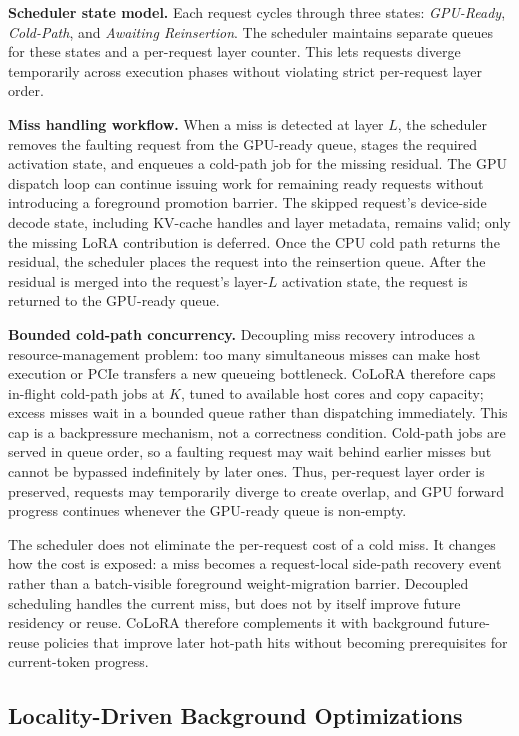 \documentclass[sigplan,anonymous,review,10pt]{acmart}
\begin{document}
\noindent\textbf{Scheduler state model.}
Each request cycles through three states: \textit{GPU-Ready}, \textit{Cold-Path}, and \textit{Awaiting Reinsertion}. The scheduler maintains separate queues for these states and a per-request layer counter. This lets requests diverge temporarily across execution phases without violating strict per-request layer order.

\noindent\textbf{Miss handling workflow.}
When a miss is detected at layer $L$, the scheduler removes the faulting request from the GPU-ready queue, stages the required activation state, and enqueues a cold-path job for the missing residual. The GPU dispatch loop can continue issuing work for remaining ready requests without introducing a foreground promotion barrier. The skipped request's device-side decode state, including KV-cache handles and layer metadata, remains valid; only the missing LoRA contribution is deferred. Once the CPU cold path returns the residual, the scheduler places the request into the reinsertion queue. After the residual is merged into the request's layer-$L$ activation state, the request is returned to the GPU-ready queue.

\noindent\textbf{Bounded cold-path concurrency.}
Decoupling miss recovery introduces a resource-management problem: too many simultaneous misses can make host execution or PCIe transfers a new queueing bottleneck. CoLoRA therefore caps in-flight cold-path jobs at $K$, tuned to available host cores and copy capacity; excess misses wait in a bounded queue rather than dispatching immediately. This cap is a backpressure mechanism, not a correctness condition. Cold-path jobs are served in queue order, so a faulting request may wait behind earlier misses but cannot be bypassed indefinitely by later ones. Thus, per-request layer order is preserved, requests may temporarily diverge to create overlap, and GPU forward progress continues whenever the GPU-ready queue is non-empty.

The scheduler does not eliminate the per-request cost of a cold miss. It changes how the cost is exposed: a miss becomes a request-local side-path recovery event rather than a batch-visible foreground weight-migration barrier. Decoupled scheduling handles the current miss, but does not by itself improve future residency or reuse. CoLoRA therefore complements it with background future-reuse policies that improve later hot-path hits without becoming prerequisites for current-token progress.

\subsection{Locality-Driven Background Optimizations}
\label{subsec:locality-background}
\end{document}
